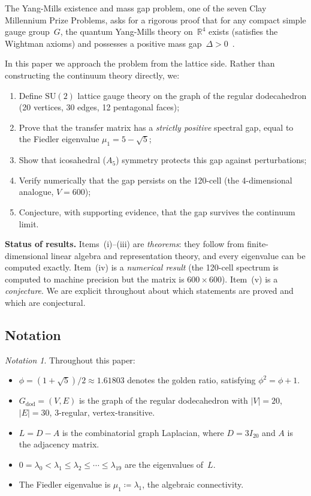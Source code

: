 \documentclass[12pt,a4paper]{article}
\theoremstyle{definition}
\theoremstyle{remark}
\newtheorem*{notation}{Notation}
\newcommand{\R}{\mathbb{R}}
\newcommand{\SU}{\mathrm{SU}}
\newcommand{\ph}{\phi}
\begin{document}
The Yang-Mills existence and mass gap problem, one of the seven Clay
Millennium Prize Problems, asks for a rigorous proof that for any compact
simple gauge group~$G$, the quantum Yang-Mills theory on~$\R^4$ exists
(satisfies the Wightman axioms) and possesses a positive mass
gap~$\Delta > 0$~\cite{jaffewitten2000}.

In this paper we approach the problem from the lattice side.  Rather than
constructing the continuum theory directly, we:
\begin{enumerate}[label=(\roman*)]
  \item Define $\SU(2)$ lattice gauge theory on the graph of the regular
        dodecahedron (20 vertices, 30 edges, 12 pentagonal faces);
  \item Prove that the transfer matrix has a \emph{strictly positive}
        spectral gap, equal to the Fiedler eigenvalue
        $\mu_1 = 5 - \sqrt{5}$;
  \item Show that icosahedral ($A_5$) symmetry protects this gap against
        perturbations;
  \item Verify numerically that the gap persists on the 120-cell
        (the 4-dimensional analogue, $V=600$);
  \item Conjecture, with supporting evidence, that the gap survives
        the continuum limit.
\end{enumerate}

\medskip

\noindent\textbf{Status of results.}
Items~(i)--(iii) are \emph{theorems}: they follow from finite-dimensional
linear algebra and representation theory, and every eigenvalue can be
computed exactly.  Item~(iv) is a \emph{numerical result} (the 120-cell
spectrum is computed to machine precision but the matrix is $600\times 600$).
Item~(v) is a \emph{conjecture}.  We are explicit throughout about which
statements are proved and which are conjectural.

\subsection{Notation}\label{ssec:notation}

\begin{notation}
Throughout this paper:
\begin{itemize}
  \item $\ph = (1 + \sqrt{5})/2 \approx 1.61803$ denotes the golden ratio,
        satisfying $\ph^2 = \ph + 1$.
  \item $G_{\mathrm{dod}} = (V, E)$ is the graph of the regular dodecahedron
        with $|V| = 20$, $|E| = 30$, 3-regular, vertex-transitive.
  \item $L = D - A$ is the combinatorial graph Laplacian, where $D = 3I_{20}$
        and $A$ is the adjacency matrix.
  \item $0 = \lambda_0 < \lambda_1 \le \lambda_2 \le \cdots \le \lambda_{19}$
        are the eigenvalues of~$L$.
  \item The Fiedler eigenvalue is $\mu_1 \coloneqq \lambda_1$, the algebraic
        connectivity.
\end{itemize}
\end{notation}
\end{document}

